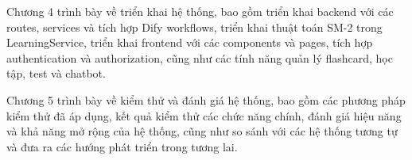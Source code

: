 \documentclass[../DoAn.tex]{subfiles}
\begin{document}
Chương 4 trình bày về triển khai hệ thống, bao gồm triển khai backend với các routes, services và tích hợp Dify workflows, triển khai thuật toán SM-2 trong LearningService, triển khai frontend với các components và pages, tích hợp authentication và authorization, cũng như các tính năng quản lý flashcard, học tập, test và chatbot.

Chương 5 trình bày về kiểm thử và đánh giá hệ thống, bao gồm các phương pháp kiểm thử đã áp dụng, kết quả kiểm thử các chức năng chính, đánh giá hiệu năng và khả năng mở rộng của hệ thống, cũng như so sánh với các hệ thống tương tự và đưa ra các hướng phát triển trong tương lai.
\end{document}
